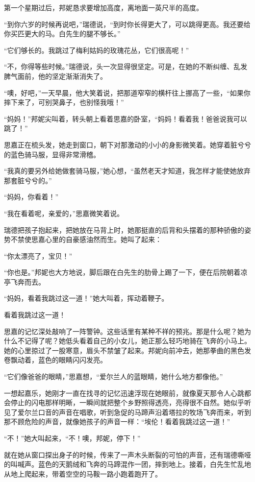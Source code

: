 \par 第一个星期过后，邦妮恳求要增加高度，离地面一英尺半的高度。
\par “到你六岁的时候再说吧，”瑞德说，“到时你长得更大了，可以跳得更高。我还要给你买匹更大的马。白先生的腿不够长。”
\par “它们够长的。我跳过了梅利姑妈的玫瑰花丛，它们很高呢！”
\par “不，你得等些时候。”瑞德说，头一次显得很坚定。可是，在她的不断纠缠、乱发脾气面前，他的坚定渐渐消失了。
\par “噢，好吧，”一天早晨，他大笑着说，把那道窄窄的横杆往上挪高了一些，“如果你摔下来了，可别哭鼻子，也别怪我哦！”
\par “妈妈！”邦妮尖叫着，转头朝上看着思嘉的卧室，“妈妈！看着我！爸爸说我可以跳了！”
\par 思嘉正在梳头发，她走到窗口，朝下对那激动的小小的身影微笑着。她穿着脏兮兮的蓝色骑马服，显得非常滑稽。
\par “我真的要另外给她做套骑马服，”她心想，“虽然老天才知道，我怎样才能使她放弃那套脏兮兮的。”
\par “妈妈，你看着！”
\par “我在看着呢，亲爱的，”思嘉微笑着说。
\par 瑞德把孩子抱起来，把她放在马背上时，她那挺直的后背和头摆着的那种骄傲的姿势不禁使思嘉心里的自豪感油然而生。她叫了起来：
\par “你太漂亮了，宝贝！”
\par “你也是。”邦妮也大方地说，脚后跟在白先生的肋骨上踢了一下，便在后院朝着凉亭飞奔而去。
\par “妈妈，看着我跳过这一道！”她大叫着，挥动着鞭子。
\par 看着我跳过这一道！
\par 思嘉的记忆深处敲响了一阵警钟。这些话里有某种不祥的预兆。那是什么呢？她为什么不记得了呢？她低头看着自己的小女儿，她正那么轻巧地骑在飞奔的小马上。她的心里掠过了一股寒意，眉头不禁皱了起来。邦妮向前冲去，她那拳曲的黑色发卷飘动着，蓝色的眼睛闪闪发亮。
\par “它们像爸爸的眼睛，”思嘉想，“爱尔兰人的蓝眼睛，她什么地方都像他。”
\par 一想起嘉乐，她刚才一直在找寻的记忆迅速浮现在她眼前，就像夏天那令人心跳都会停止的闪电那样明晰，一瞬间就把整个乡野照得透亮，亮得很不自然。她似乎听见了爱尔兰口音的声音在唱歌，听到急促的马蹄声沿着塔拉的牧场飞奔而来，听到那不顾危险的声音，就像她孩子的声音一样：“埃伦！看着我跳过这一道！”
\par “不！”她大叫起来，“不！噢，邦妮，停下！”
\par 就在她从窗口探出身子的时候，传来了一声木头断裂的可怕的声音，还有瑞德嘶哑的叫喊声。蓝色的天鹅绒和飞奔的马蹄混作一团，摔到地上。接着，白先生忙乱地从地上爬起来，带着空空的马鞍一路小跑着跑开了。
